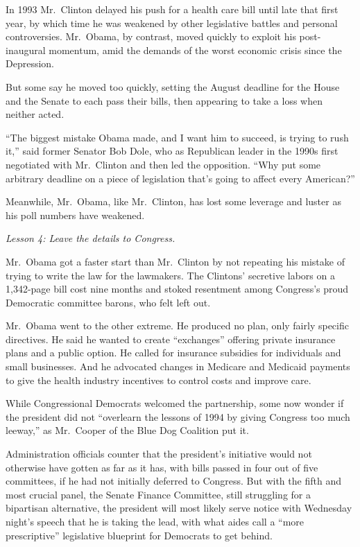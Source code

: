 ﻿\documentclass[12pt]{article}
\begin{document}
In 1993 Mr.~Clinton delayed his push for a health care bill until late that first year, by which
time he was weakened by other legislative battles and personal controversies. Mr.~Obama, by
contrast, moved quickly to exploit his post-inaugural momentum, amid the demands of the worst
economic crisis since the Depression.

But some say he moved too quickly, setting the August deadline for the House and the Senate to each
pass their bills, then appearing to take a loss when neither acted.

``The biggest mistake Obama made, and I want him to succeed, is trying to rush it,'' said former
Senator Bob Dole, who as Republican leader in the 1990s first negotiated with Mr.~Clinton and then
led the opposition. ``Why put some arbitrary deadline on a piece of legislation that's going to
affect every American?''

Meanwhile, Mr.~Obama, like Mr.~Clinton, has lost some leverage and luster as his poll numbers have
weakened.

\emph{Lesson 4: Leave the details to Congress.}

Mr.~Obama got a faster start than Mr.~Clinton by not repeating his mistake of trying to write the
law for the lawmakers. The Clintons' secretive labors on a 1,342-page bill cost nine months and
stoked resentment among Congress's proud Democratic committee barons, who felt left out.

Mr.~Obama went to the other extreme. He produced no plan, only fairly specific directives. He said
he wanted to create ``exchanges'' offering private insurance plans and a public option. He called
for insurance subsidies for individuals and small businesses. And he advocated changes in Medicare
and Medicaid payments to give the health industry incentives to control costs and improve care.

While Congressional Democrats welcomed the partnership, some now wonder if the president did not
``overlearn the lessons of 1994 by giving Congress too much leeway,'' as Mr.~Cooper of the Blue Dog
Coalition put it.

Administration officials counter that the president's initiative would not otherwise have gotten as
far as it has, with bills passed in four out of five committees, if he had not initially deferred to
Congress. But with the fifth and most crucial panel, the Senate Finance Committee, still struggling
for a bipartisan alternative, the president will most likely serve notice with Wednesday night's
speech that he is taking the lead, with what aides call a ``more prescriptive'' legislative
blueprint for Democrats to get behind.
\end{document}
